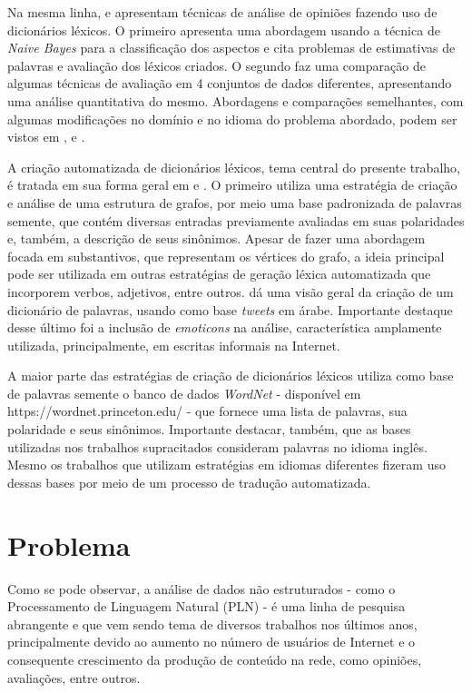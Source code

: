 \documentclass[a4paper,11pt]{article}
\begin{document}
Na mesma linha, \cite{eisenstein2016unsupervised} e \cite{bandhakavi2016lexicon} apresentam técnicas de análise de opiniões fazendo uso de dicionários léxicos. O primeiro apresenta uma abordagem usando a técnica de \emph{Naive Bayes} para a classificação dos aspectos e cita problemas de estimativas de palavras e avaliação dos léxicos criados. O segundo faz uma comparação de algumas técnicas de avaliação em 4 conjuntos de dados diferentes, apresentando uma análise quantitativa do mesmo. Abordagens e comparações semelhantes, com algumas modificações no domínio e no idioma do problema abordado, podem ser vistos em \cite{khoo2017lexicon}, \cite{asghar2014review} e \cite{ding2008holistic}.

A criação automatizada de dicionários léxicos, tema central do presente trabalho, é tratada em sua forma geral em \cite{widdows2002graph} e \cite{duwairi2015detecting}. O primeiro utiliza uma estratégia de criação e análise de uma estrutura de grafos, por meio uma base padronizada de palavras semente, que contém diversas entradas previamente avaliadas em suas polaridades e, também, a descrição de seus sinônimos. Apesar de fazer uma abordagem focada em substantivos, que representam os vértices do grafo, a ideia principal pode ser utilizada em outras estratégias de geração léxica automatizada que incorporem verbos, adjetivos, entre outros. \cite{duwairi2015detecting} dá uma visão geral da criação de um dicionário de palavras, usando como base \emph{tweets} em árabe. Importante destaque desse último foi a inclusão de \emph{emoticons} na análise, característica amplamente utilizada, principalmente, em escritas informais na Internet.

A maior parte das estratégias de criação de dicionários léxicos utiliza como base de palavras semente o banco de dados \emph{WordNet} - disponível em https://wordnet.princeton.edu/ - que fornece uma lista de palavras, sua polaridade e seus sinônimos. Importante destacar, também, que as bases utilizadas nos trabalhos supracitados consideram palavras no idioma inglês. Mesmo os trabalhos que utilizam estratégias em idiomas diferentes fizeram uso dessas bases por meio de um processo de tradução automatizada.

\section{Problema}
Como se pode observar, a análise de dados não estruturados - como o Processamento de Linguagem Natural (PLN) - é uma linha de pesquisa abrangente e que vem sendo tema de diversos trabalhos nos últimos anos, principalmente devido ao aumento no número de usuários de Internet e o consequente crescimento da produção de conteúdo na rede, como opiniões, avaliações, entre outros. 
\end{document}
